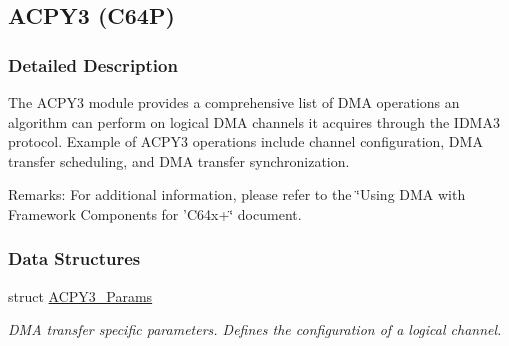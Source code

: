 \hypertarget{group___d_s_p_a_c_p_y3}{
\subsection{ACPY3 (C64P)}
\label{group___d_s_p_a_c_p_y3}
}


\subsubsection{Detailed Description}
The ACPY3 module provides a comprehensive list of DMA operations an algorithm can perform on logical DMA channels it acquires through the IDMA3 protocol. Example of ACPY3 operations include channel configuration, DMA transfer scheduling, and DMA transfer synchronization.

\begin{Desc}
\item[Remarks:]For additional information, please refer to the \char`\"{}Using DMA with Framework Components for 'C64x+\char`\"{} document. \end{Desc}


\subsubsection*{Data Structures}
\begin{CompactItemize}
\item 
struct \hyperlink{struct_a_c_p_y3___params}{ACPY3\_\-Params}
\begin{CompactList}\small\item\em DMA transfer specific parameters. Defines the configuration of a logical channel. \item\end{CompactList}\end{CompactItemize}
